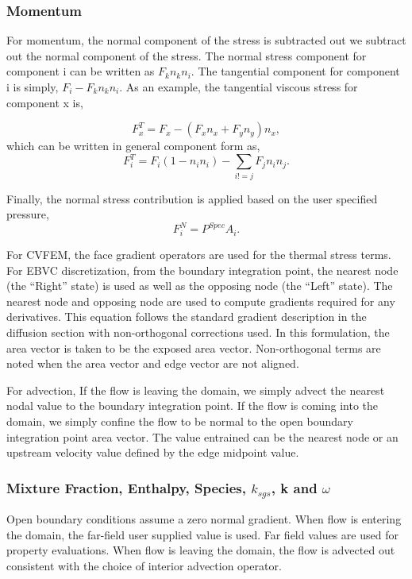 {\subsubsection{Momentum}
For momentum, the normal component of the stress is subtracted out we subtract out the normal component of the stress. The normal stress
component for component i can be written as $F_k n_k n_i$. The tangential 
component for component i is simply, $F_i - F_k n_k n_i$. As an example, the tangential
viscous stress for component x is,

\begin{equation}
  F^T_x = F_x - (F_x n_x + F_y n_y ) n_x,
\end{equation}
which can be written in general component form as,
\begin{equation}
  F^T_i = F_i(1-n_i n_i) - \sum_{i!=j} F_j n_i n_j.
\end{equation}

Finally, the normal stress contribution is applied based on the user specified pressure,
\begin{equation}
  F^N_i = P^{Spec} A_i.
\end{equation}

For CVFEM, the face gradient operators are used for the thermal stress terms. For EBVC discretization, 
from the boundary integration
point, the nearest node (the ``Right'' state) is used as well as the opposing node
(the ``Left'' state). The nearest node and opposing node are used to compute
gradients required for any derivatives. This equation follows the standard
gradient description in the diffusion section with non-orthogonal corrections used.
In this formulation, the area vector is taken to be the exposed area vector. 
Non-orthogonal terms are noted when the area vector and edge vector are not aligned.

For advection, If the flow is leaving the domain, we simply advect the nearest nodal value
to the boundary integration point. If the flow is coming into the domain,
we simply confine the flow to be normal to the open boundary integration 
point area vector. The value entrained can be the nearest node
or an upstream velocity value defined by the edge midpoint value. 

\subsubsection{Mixture Fraction, Enthalpy, Species, $k_{sgs}$, k and $\omega$ }
Open boundary conditions assume a zero normal gradient. When flow is entering the domain, the far-field
user supplied value is used. Far field values are used for property evaluations. When flow is leaving the domain, 
the flow is advected out consistent with the
choice of interior advection operator.

}
